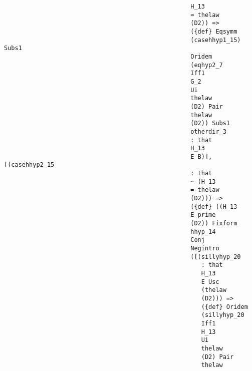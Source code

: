 \documentclass[12pt]{article}
\begin{document}
\begin{verbatim}
                                                    H_13 
                                                    = thelaw 
                                                    (D2)) => 
                                                    ({def} Eqsymm 
                                                    (casehhyp1_15) Subs1 
                                                    Oridem 
                                                    (eqhyp2_7 
                                                    Iff1 
                                                    G_2 
                                                    Ui 
                                                    thelaw 
                                                    (D2) Pair 
                                                    thelaw 
                                                    (D2)) Subs1 
                                                    otherdir_3 
                                                    : that 
                                                    H_13 
                                                    E B)], [(casehhyp2_15 
                                                    : that 
                                                    ~ (H_13 
                                                    = thelaw 
                                                    (D2))) => 
                                                    ({def} ((H_13 
                                                    E prime 
                                                    (D2)) Fixform 
                                                    hhyp_14 
                                                    Conj 
                                                    Negintro 
                                                    ([(sillyhyp_20 
                                                       : that 
                                                       H_13 
                                                       E Usc 
                                                       (thelaw 
                                                       (D2))) => 
                                                       ({def} Oridem 
                                                       (sillyhyp_20 
                                                       Iff1 
                                                       H_13 
                                                       Ui 
                                                       thelaw 
                                                       (D2) Pair 
                                                       thelaw 

\end{verbatim}
\end{document}
